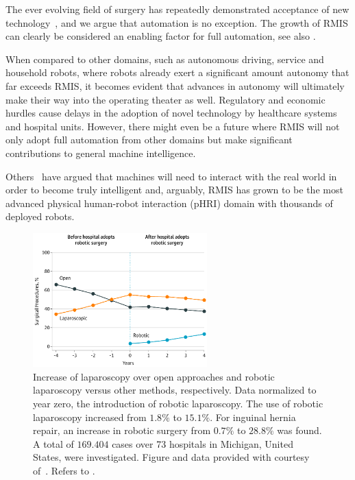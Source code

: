 The ever evolving field of surgery has repeatedly demonstrated acceptance of new technology~\cite{attanasio2021autonomoy}, and we argue that automation is no exception. The growth of RMIS can clearly be considered an enabling factor for full automation, see also .

When compared to other domains, such as autonomous driving, service and household robots, where robots already exert a significant amount autonomy that far exceeds RMIS, it becomes evident that advances in autonomy will ultimately make their way into the operating theater as well. Regulatory and economic hurdles cause delays in the adoption of novel technology by healthcare systems and hospital units. However, there might even be a future where RMIS will not only adopt full automation from other domains but make significant contributions to general machine intelligence. 

Others~\cite{lecun2022path} have argued that machines will need to interact with the real world in order to become truly intelligent and, arguably, RMIS has grown to be the most advanced physical human-robot interaction (pHRI) domain with thousands of deployed robots.
\begin{figure}[t]
    \centering
    \includegraphics[width=0.6\textwidth]{introduction/img/robotic_since_introduction.png}
    \caption{Increase of laparoscopy over open approaches and robotic laparoscopy versus other methods, respectively. Data normalized to year zero, the introduction of robotic laparoscopy. The use of robotic laparoscopy increased from $1.8\%$ to $15.1\%$. For inguinal hernia repair, an increase in robotic surgery from $0.7\%$ to $28.8\%$ was found. A total of $169.404$ cases over 73 hospitals in Michigan, United States, were investigated. Figure and data provided with courtesy of~\cite{sheetz2020trends}. Refers to .}
    \label{in:fig:robotic_vs_laparoscopic_vs_open}
\end{figure}


